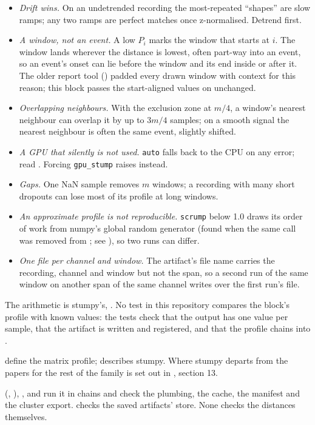 \begin{itemize}
\item \emph{Drift wins.} On an undetrended recording the most-repeated ``shapes'' are slow ramps;
  any two ramps are perfect matches once z-normalised. Detrend first.
\item \emph{A window, not an event.} A low $P_i$ marks the window that starts at $i$. The window
  lands wherever the distance is lowest, often part-way into an event, so an event's onset can lie
  before the window and its end inside or after it. The older report tool
  () padded every drawn window with context for this reason; this
  block passes the start-aligned values on unchanged.
\item \emph{Overlapping neighbours.} With the exclusion zone at $m/4$, a window's nearest
  neighbour can overlap it by up to $3m/4$ samples; on a smooth signal the nearest neighbour is
  often the same event, slightly shifted.
\item \emph{A GPU that silently is not used.} \texttt{auto} falls back to the CPU on any error;
  read . Forcing \texttt{gpu\_stump} raises instead.
\item \emph{Gaps.} One NaN sample removes $m$ windows; a recording with many short dropouts can
  lose most of its profile at long windows.
\item \emph{An approximate profile is not reproducible.} \texttt{scrump} below 1.0 draws its order
  of work from numpy's global random generator (found when the same call was removed from
  ; see ),
  so two runs can differ.
\item \emph{One file per channel and window.} The artifact's file name carries the recording,
  channel and window but not the span, so a second run of the same window on another span of the
  same channel writes over the first run's file.
\end{itemize}

The arithmetic is stumpy's, . No test in this
repository compares the block's profile with known values: the tests check that the output has one
value per sample, that the artifact is written and registered, and that the profile chains into
.

\citet{yeh2016matrix} define the matrix profile; \citet{law2019stumpy} describes stumpy. Where
stumpy departs from the papers for the rest of the family is set out in
, section 13.

 (,
),
,  and 
run it in chains and check the plumbing, the cache, the manifest and the cluster export.
 checks the saved artifacts' store. None checks the
distances themselves.
